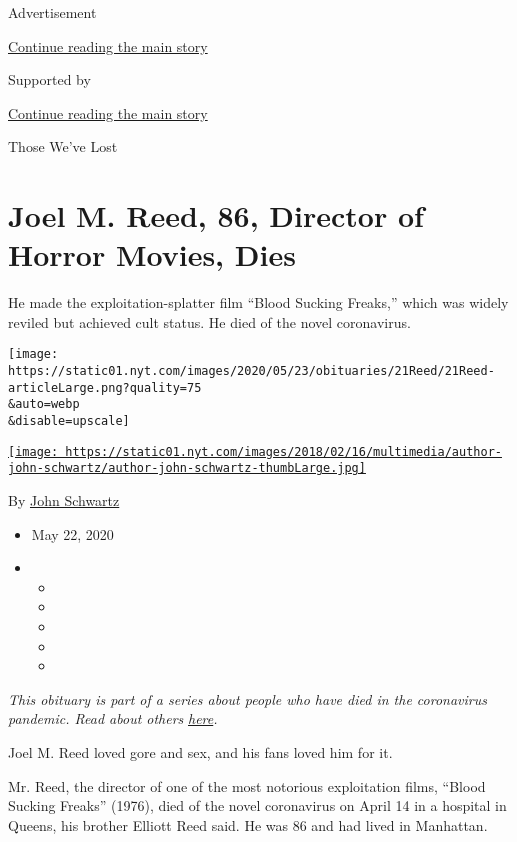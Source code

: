 Advertisement

\protect\hyperlink{after-top}{Continue reading the main story}

Supported by

\protect\hyperlink{after-sponsor}{Continue reading the main story}

Those We've Lost

\hypertarget{joel-m-reed-86-director-of-horror-movies-dies}{%
\section{Joel M. Reed, 86, Director of Horror Movies,
Dies}\label{joel-m-reed-86-director-of-horror-movies-dies}}

He made the exploitation-splatter film ``Blood Sucking Freaks,'' which
was widely reviled but achieved cult status. He died of the novel
coronavirus.

\texttt{[image: https://static01.nyt.com/images/2020/05/23/obituaries/21Reed/21Reed-articleLarge.png?quality=75\\\&auto=webp\\\&disable=upscale]}

\href{https://www.nytimes.com/by/john-schwartz}{\texttt{[image: https://static01.nyt.com/images/2018/02/16/multimedia/author-john-schwartz/author-john-schwartz-thumbLarge.jpg]}}

By \href{https://www.nytimes.com/by/john-schwartz}{John Schwartz}

\begin{itemize}
\item
  May 22, 2020
\item
  \begin{itemize}
  \item
  \item
  \item
  \item
  \item
  \end{itemize}
\end{itemize}

\emph{This obituary is part of a series about people who have died in
the coronavirus pandemic. Read about others}
\href{https://www.nytimes.com/series/people-who-have-died-of-the-coronavirus}{\emph{here}}\emph{.}

Joel M. Reed loved gore and sex, and his fans loved him for it.

Mr. Reed, the director of one of the most notorious exploitation films,
``Blood Sucking Freaks'' (1976), died of the novel coronavirus on April
14 in a hospital in Queens, his brother Elliott Reed said. He was 86 and
had lived in Manhattan.

